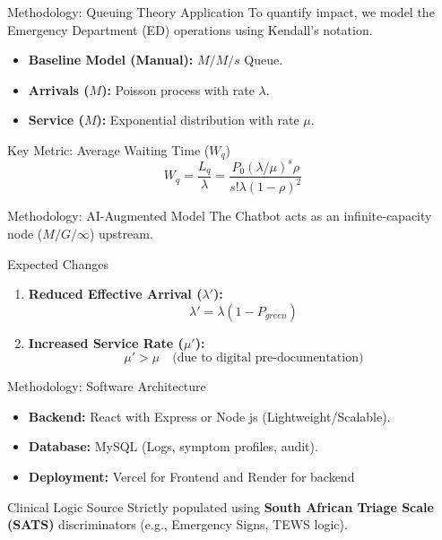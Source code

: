 \documentclass[aspectratio=169,12pt]{beamer}
\begin{document}
	\begin{frame}{Methodology: Queuing Theory Application}
		To quantify impact, we model the Emergency Department (ED) operations using Kendall's notation.
		
		\begin{itemize}
			\item \textbf{Baseline Model (Manual):} $M/M/s$ Queue.
			\item \textbf{Arrivals ($M$):} Poisson process with rate $\lambda$.
			\item \textbf{Service ($M$):} Exponential distribution with rate $\mu$.
		\end{itemize}
		
		\begin{block}{Key Metric: Average Waiting Time ($W_q$)}
			\begin{equation}
				W_q = \frac{L_q}{\lambda} = \frac{P_0 (\lambda/\mu)^s \rho}{s! \lambda (1-\rho)^2}
			\end{equation}
		\end{block}
	\end{frame}
	
	\begin{frame}{Methodology: AI-Augmented Model}
		The Chatbot acts as an infinite-capacity node ($M/G/\infty$) upstream.
		
		\begin{alertblock}{Expected Changes}
			\begin{enumerate}
				\item \textbf{Reduced Effective Arrival ($\lambda'$):}
				\begin{equation*}
					\lambda' = \lambda (1 - P_{green})
				\end{equation*}
				\item \textbf{Increased Service Rate ($\mu'$):}
				\begin{equation*}
					\mu' > \mu \quad \text{(due to digital pre-documentation)}
				\end{equation*}
			\end{enumerate}
		\end{alertblock}
	\end{frame}
	
	\begin{frame}{Methodology: Software Architecture}
		\begin{itemize}
			\item \textbf{Backend:} React with Express or Node js (Lightweight/Scalable).
			\item \textbf{Database:} MySQL (Logs, symptom profiles, audit).
			\item \textbf{Deployment:} Vercel for Frontend and Render for backend
		\end{itemize} 
		
		\begin{exampleblock}{Clinical Logic Source}
			Strictly populated using \textbf{South African Triage Scale (SATS)} discriminators (e.g., Emergency Signs, TEWS logic).
		\end{exampleblock}
	\end{frame}
	
\end{document}
